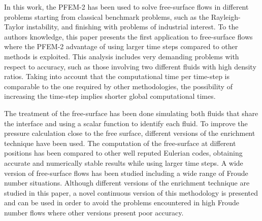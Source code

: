 
In this work, the PFEM-2 has been used to solve free-surface flows in different problems starting from classical benchmark problems, such as the Rayleigh-Taylor instability, and finishing with problems of industrial interest. To the authors knowledge, this paper presents the first application to free-surface flows where the PFEM-2 advantage of using larger time steps compared to other methods is exploited. This analysis includes very demanding problems with respect to accuracy, such as those involving two different fluids with high density ratios. Taking into account that the computational time per time-step is comparable to the one required by other methodologies, the possibility of increasing the time-step implies shorter global computational times.

The treatment of the free-surface has been done simulating both fluids that share the interface and using a scalar function to identify each fluid. To improve the pressure calculation close to the free surface, different versions of the enrichment technique \cite{Coppola05} have been used. The computation of the free-surface at different positions has been compared to other well reputed Eulerian codes, obtaining accurate and numerically stable results while using larger time steps. A wide version of free-surface flows has been studied including a wide range of Froude number situations. Although different versions of the enrichment technique are studied in this paper, a novel continuous version of this methodology is presented and can be used in order to avoid the problems encountered in high Froude number flows where other versions present poor accuracy. 